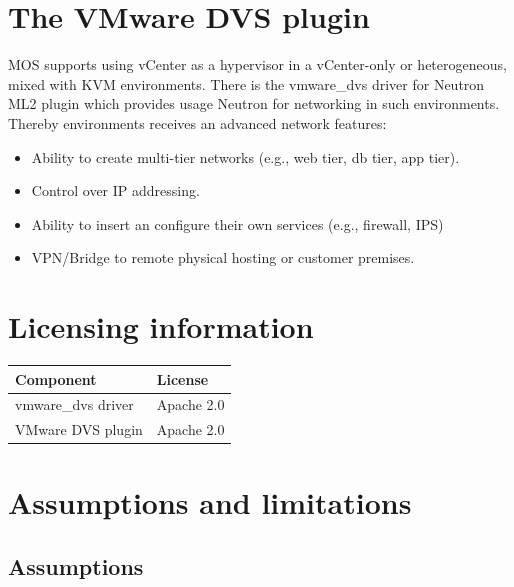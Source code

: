 \documentclass{article}
\begin{document}
\section{The VMware DVS plugin}

MOS supports using vCenter as a hypervisor in a vCenter-only or heterogeneous, mixed with KVM environments. There is the vmware\_dvs  driver for Neutron ML2 plugin which provides usage Neutron for networking in such environments. Thereby environments receives an advanced network features:

\begin{itemize}

\item Ability to create multi-tier networks (e.g., web tier, db tier, app tier).

\item Control over IP addressing.

\item Ability to insert an configure their own services (e.g., firewall, IPS)

\item VPN/Bridge to remote physical hosting or customer premises.

\end{itemize}

\section{Licensing information}

\begin{table}[h]
\begin{tabular}{|p{8cm}|p{8cm}|}
\hline
\textbf{Component} & \textbf{License} \\
\hline
vmware\_dvs driver & Apache 2.0 \\
\hline
VMware DVS plugin & Apache 2.0 \\
\hline
\end{tabular}
\end{table}

\section{Assumptions and limitations}

\subsection{Assumptions}
\end{document}
